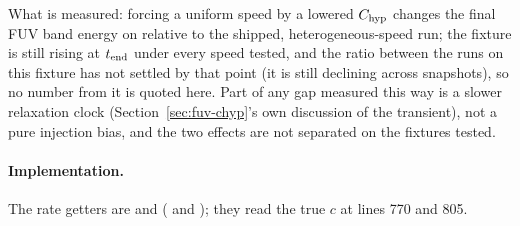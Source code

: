 What is measured: forcing a uniform speed by a lowered $C_{\rm hyp}$ changes the final FUV band energy on
 relative to the shipped, heterogeneous-speed run;
the fixture is still rising at $t_{\rm end}$ under every speed tested, and
the ratio between the runs on this fixture has not
settled by that point (it is still declining across snapshots), so no number
from it is quoted here. Part of any gap measured this way is a slower
relaxation clock (Section~\ref{sec:fuv-chyp}'s own discussion of the
transient), not a pure injection bias, and the two effects are not
separated on the fixtures tested.

\paragraph{Implementation.} The rate getters are
 and
( and ); they read the
true $c$ at lines 770 and 805.

